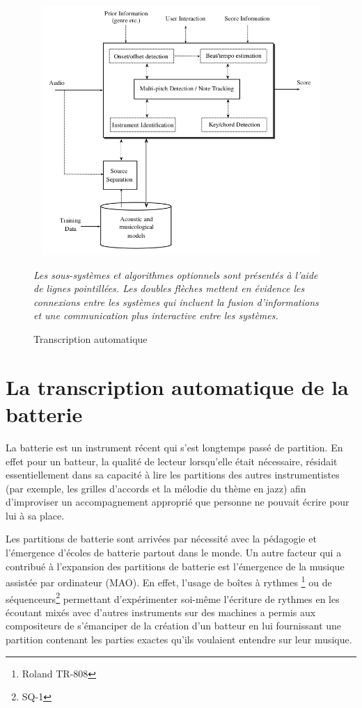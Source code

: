 \begin{figure}[!h]
	\centering
	\includegraphics[height=95mm, width=130mm]{z_images/1_contexte/1_general_process.png}
	\caption{Transcription automatique}
	\label{AMT_presentation}
	\textit{Les sous-systèmes et algorithmes optionnels sont présentés à l'aide
    de lignes pointillées. Les doubles flèches mettent en évidence les
connexions entre les systèmes qui incluent la fusion d'informations et une
communication plus interactive entre les systèmes.}
\end{figure}%
{}
\section{La transcription automatique de la batterie}
La batterie est un instrument récent qui s’est longtemps passé de partition. En
effet pour un batteur, la qualité de lecteur lorsqu’elle était nécessaire,
résidait essentiellement dans sa capacité à lire les partitions des autres
instrumentistes (par exemple, les grilles d’accords et la mélodie du thème en
jazz) afin d’improviser un accompagnement approprié que personne ne pouvait
écrire pour lui à sa place.

Les partitions de batterie sont arrivées par nécessité avec la pédagogie et
l’émergence d’écoles de batterie partout dans le monde. 
Un autre facteur qui a
contribué à l’expansion des partitions de batterie est l’émergence de la
musique assistée par ordinateur (MAO). En effet, l’usage de boîtes à rythmes
\footnote{Roland TR-808} ou de séquenceurs\footnote{SQ-1} permettant
d’expérimenter soi-même l’écriture de rythmes en les écoutant mixés avec
d’autres instruments sur des machines a permis aux compositeurs de s’émanciper
de la création d’un batteur en lui fournissant une partition contenant les
parties exactes qu’ils voulaient entendre sur leur musique.

